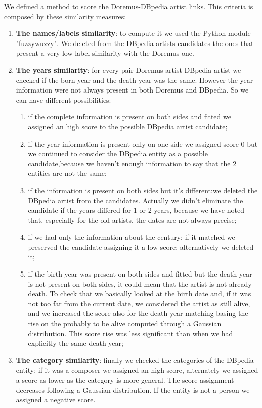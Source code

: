 \documentclass[paper=a4, fontsize=11pt]{scrartcl}
\begin{document}
We defined a method to score the Doremus-DBpedia artist links. This criteria is composed by these similarity measures:
\begin{enumerate}

\item \textbf{The names/labels similarity}: to compute it we used the Python module "fuzzywuzzy". We deleted from the DBpedia artists candidates the ones that present a very low label similarity with the Doremus one.

\item \textbf{The years similarity}: for every pair Doremus artist-DBpedia artist we checked if the born year and the death year was the same. However the year information were not always present in both Doremus and DBpedia. So we can have different possibilities:
\begin{enumerate}
\item if the complete information is present on both sides and fitted we assigned an high score to the possible DBpedia artist candidate;
\item if the year information is present only on one side we assigned score 0 but we continued to consider the DBpedia entity as a possible candidate,because we haven't enough information to say that the 2 entities are not the same;
\item if the information is present on both sides but it's different:we deleted the DBpedia artist from the candidates. Actually we didn't eliminate the candidate if the years differed for 1 or 2 years, because we have noted that, especially for the old artists, the dates are not always precise;
\item if we had only the information about the century: if it matched we preserved the candidate assigning it a low score; alternatively we deleted it;
\item if the birth year was present on both sides and fitted but the death year is not present on both sides, it could mean that the artist is not already death. To check that we basically looked at the birth date and, if it was not too far from the current date, we considered the artist as still alive, and we increased the score also for the death year matching basing the rise on the probably to be alive computed through a Gaussian distribution. This score rise was less significant than when we had explicitly the same death year;

\end{enumerate}
\item \textbf{The category similarity}: finally we checked the categories of the DBpedia entity: if it was a composer we assigned an high score, alternately we assigned a score as lower as the category is more general. The score assignment decreases following a Gaussian distribution. If the entity is not a person we assigned a negative score.
\end{enumerate}
\end{document}
